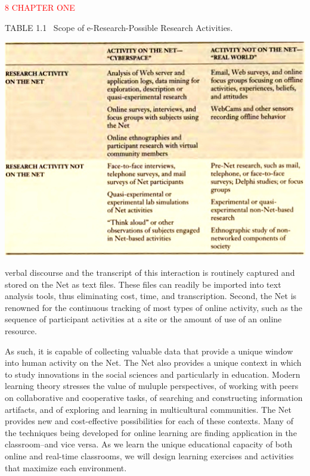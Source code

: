\documentclass [8pt]{beamer}
\begin{document}
\begin{frame}
 
    \begin{flushleft}
    \textcolor{red}{8  CHAPTER ONE}	
    \end{flushleft}
    
    \begin{flushleft}
    	TABLE 1.1   \  Scope of e-Research-Possible Research Activities.	
    \end{flushleft}
   	   	
   	\begin{center}
   	\includegraphics[scale=0.18]{1m}	
   	\end{center}
     
     verbal discourse and the transcript of this interaction is routinely captured and stored on the Net as text files. These files can readily be imported into text analysis tools, thus eliminating cost, time, and transcription. Second, the Net is renowned for the continuous tracking of most types of online activity, such as the sequence of participant activities at a site or the amount of use of an online resource.

\end{frame}	 

\begin{frame}
	
	 As such, it is capable of collecting valuable data that provide a unique window into human activity on the Net.
	The Net also provides a unique 
	context in which to study innovations in the social sciences and particularly in education. Modern learning theory stresses the value of muluple perspectives, of working with peers on collaborative and cooperative tasks, of searching and constructing information artifacts, and of exploring and learning in multicultural communities. The Net provides new and cost-effective possibilities for each of these contexts. Many of the techniques being developed for online learning are finding application in the classroom--and vice versa. As we learn the unique educational capacity of both online and real-time classrooms, we will design learning exercises and activities that maximize each environment.
	
\end{frame}
\end{document}
